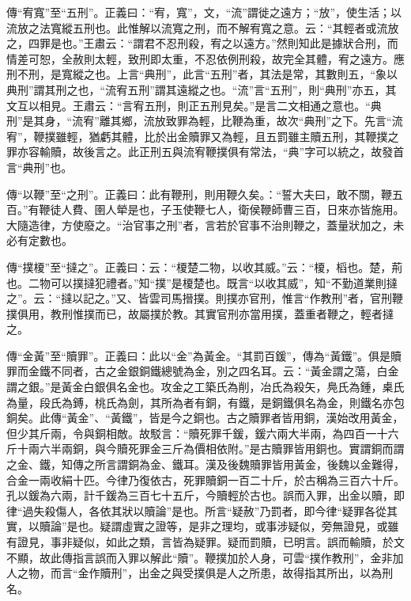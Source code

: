 {\noindent\zhuan{}\fzbyks 傳“宥寬”至“五刑”。正義曰：“宥，寬”，文，“流”謂徙之遠方；“放”，使生活；以流放之法寬縱五刑也。此惟解以流寬之刑，而不解宥寬之意。云：“其輕者或流放之，四罪是也。”王肅云：“謂君不忍刑殺，宥之以遠方。”然則知此是據狀合刑，而情差可恕，全赦則太輕，致刑即太重，不忍依例刑殺，故完全其體，宥之遠方。應刑不刑，是寬縱之也。上言“典刑”，此言“五刑”者，其法是常，其數則五，“象以典刑”謂其刑之也，“流宥五刑”謂其遠縱之也。“流”言“五刑”，則“典刑”亦五，其文互以相見。王肅云：“言宥五刑，則正五刑見矣。”是言二文相通之意也。“典刑”是其身，“流宥”離其鄉，流放致罪為輕，比鞭為重，故次“典刑”之下。先言“流宥”，鞭撲雖輕，猶虧其體，比於出金贖罪又為輕，且五罰雖主贖五刑，其鞭撲之罪亦容輸贖，故後言之。此正刑五與流宥鞭撲俱有常法，“典”字可以統之，故發首言“典刑”也。 \par}

{\noindent\zhuan{}\fzbyks 傳“以鞭”至“之刑”。正義曰：此有鞭刑，則用鞭久矣。：“誓大夫曰，敢不關，鞭五百。”有鞭徒人費、圉人犖是也，子玉使鞭七人，衛侯鞭師曹三百，日來亦皆施用。大隨造律，方使廢之。“治官事之刑”者，言若於官事不治則鞭之，蓋量狀加之，未必有定數也。 \par}

{\noindent\zhuan{}\fzbyks 傳“撲榎”至“撻之”。正義曰：云：“榎楚二物，以收其威。”云：“榎，槄也。楚，荊也。二物可以撲撻犯禮者。”知“撲”是榎楚也。既言“以收其威”，知“不勤道業則撻之”。云：“撻以記之。”又、皆雲司馬搢撲。則撲亦官刑，惟言“作教刑”者，官刑鞭撲俱用，教刑惟撲而已，故屬撲於教。其實官刑亦當用撲，蓋重者鞭之，輕者撻之。 \par}

{\noindent\zhuan{}\fzbyks 傳“金黃”至“贖罪”。正義曰：此以“金”為黃金。“其罰百鍰”，傳為“黃鐵”。俱是贖罪而金鐵不同者，古之金銀銅鐵總號為金，別之四名耳。云：“黃金謂之蕩，白金謂之銀。”是黃金白銀俱名金也。攻金之工築氏為削，冶氏為殺矢，鳧氏為鍾，㮚氏為量，段氏為鎛，桃氏為劍，其所為者有銅，有鐵，是銅鐵俱名為金，則鐵名亦包銅矣。此傳“黃金”、“黃鐵”，皆是今之銅也。古之贖罪者皆用銅，漢始改用黃金，但少其斤兩，令與銅相敵。故駁言：“贖死罪千鍰，鍰六兩大半兩，為四百一十六斤十兩六半兩銅，與今贖死罪金三斤為價相依附。”是古贖罪皆用銅也。實謂銅而謂之金、鐵，知傳之所言謂銅為金、鐵耳。漢及後魏贖罪皆用黃金，後魏以金難得，合金一兩收絹十匹。今律乃復依古，死罪贖銅一百二十斤，於古稱為三百六十斤。孔以鍰為六兩，計千鍰為三百七十五斤，今贖輕於古也。誤而入罪，出金以贖，即律“過失殺傷人，各依其狀以贖論”是也。所言“疑赦”乃罰者，即今律“疑罪各從其實，以贖論”是也。疑謂虛實之證等，是非之理均，或事涉疑似，旁無證見，或雖有證見，事非疑似，如此之類，言皆為疑罪。疑而罰贖，已明言。誤而輸贖，於文不顯，故此傳指言誤而入罪以解此“贖”。鞭撲加於人身，可雲“撲作教刑”，金非加人之物，而言“金作贖刑”，出金之與受撲俱是人之所患，故得指其所出，以為刑名。 \par}

